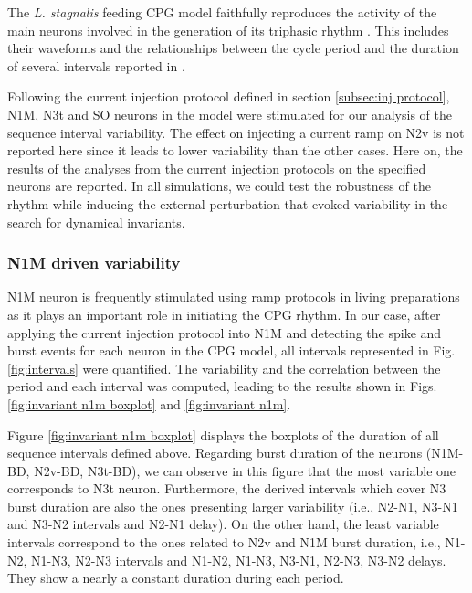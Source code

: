 
The \textit{L. stagnalis} feeding CPG model faithfully reproduces the activity of the main neurons involved in the generation of its triphasic rhythm \parencite{vavoulis_computational_2007}. This includes their waveforms and the relationships between the cycle period and the duration of several intervals reported in \parencite{elliott_temporal_1991}.




Following the current injection protocol defined in section \ref{subsec:inj protocol}, N1M, N3t and SO neurons in the model were stimulated for our analysis of the sequence interval variability. 
The effect on injecting a current ramp on N2v is not reported here since it leads to lower variability than the other cases. Here on, the results of the analyses from the  current injection protocols on the specified neurons are reported. In all simulations, we could test the robustness of the rhythm while inducing the external perturbation that evoked variability in the search for dynamical invariants.


\subsubsection{N1M driven variability}
\label{subsec:n1m driven}

N1M neuron is frequently stimulated using ramp protocols in living preparations \parencite{elliott_temporal_1991} as it plays an important role in initiating the CPG rhythm. In our case, after applying the current injection protocol into N1M and detecting the spike and burst events for each neuron in the CPG model, all  intervals represented in Fig. \ref{fig:intervals} were quantified. The variability and the correlation between the period and each interval was computed, leading to the results shown in Figs. \ref{fig:invariant n1m boxplot} and \ref{fig:invariant n1m}.

Figure \ref{fig:invariant n1m boxplot} displays the boxplots of the duration of all sequence intervals defined above. Regarding burst duration of the neurons (N1M-BD, N2v-BD, N3t-BD), we can observe in this figure that the most variable one corresponds to N3t neuron. Furthermore, the derived intervals which cover N3 burst duration are also the ones presenting larger variability (i.e., N2-N1, N3-N1 and N3-N2 intervals and N2-N1 delay). On the other hand, the least variable intervals correspond to the ones related to N2v and N1M burst duration, i.e., N1-N2, N1-N3, N2-N3 intervals and N1-N2, N1-N3, N3-N1, N2-N3, N3-N2 delays. They show a nearly a constant duration during each period.

